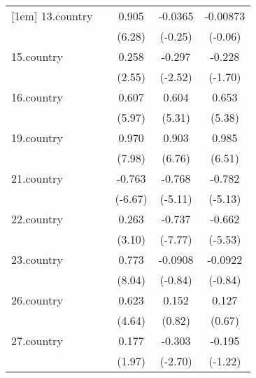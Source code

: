 {\begin{tabular}{l*{4}{c}}
[1em]
13.country  &                     &       0.905\sym{***}&     -0.0365         &    -0.00873         \\
            &                     &      (6.28)         &     (-0.25)         &     (-0.06)         \\
[1em]
15.country  &                     &       0.258\sym{*}  &      -0.297\sym{*}  &      -0.228         \\
            &                     &      (2.55)         &     (-2.52)         &     (-1.70)         \\
[1em]
16.country  &                     &       0.607\sym{***}&       0.604\sym{***}&       0.653\sym{***}\\
            &                     &      (5.97)         &      (5.31)         &      (5.38)         \\
[1em]
19.country  &                     &       0.970\sym{***}&       0.903\sym{***}&       0.985\sym{***}\\
            &                     &      (7.98)         &      (6.76)         &      (6.51)         \\
[1em]
21.country  &                     &      -0.763\sym{***}&      -0.768\sym{***}&      -0.782\sym{***}\\
            &                     &     (-6.67)         &     (-5.11)         &     (-5.13)         \\
[1em]
22.country  &                     &       0.263\sym{**} &      -0.737\sym{***}&      -0.662\sym{***}\\
            &                     &      (3.10)         &     (-7.77)         &     (-5.53)         \\
[1em]
23.country  &                     &       0.773\sym{***}&     -0.0908         &     -0.0922         \\
            &                     &      (8.04)         &     (-0.84)         &     (-0.84)         \\
[1em]
26.country  &                     &       0.623\sym{***}&       0.152         &       0.127         \\
            &                     &      (4.64)         &      (0.82)         &      (0.67)         \\
[1em]
27.country  &                     &       0.177\sym{*}  &      -0.303\sym{**} &      -0.195         \\
            &                     &      (1.97)         &     (-2.70)         &     (-1.22)         \\

\end{tabular}}
